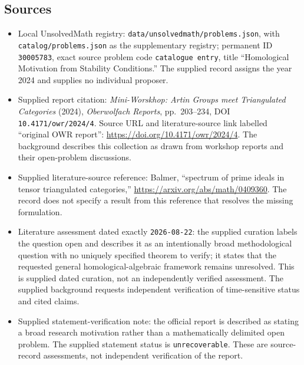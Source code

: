 \documentclass[11pt]{article}
\begin{document}
\subsection{Sources}
\begin{itemize}
\item Local UnsolvedMath registry: \texttt{data/unsolvedmath/problems.json}, with \texttt{catalog/problems.json} as the supplementary registry; permanent ID \texttt{30005783}, exact source problem code \texttt{catalogue entry}, title ``Homological Motivation from Stability Conditions.'' The supplied record assigns the year 2024 and supplies no individual proposer.
\item Supplied report citation: \emph{Mini-Worskhop: Artin Groups meet Triangulated Categories} (2024), \emph{Oberwolfach Reports}, pp.\ 203--234, DOI \texttt{10.4171/owr/2024/4}. Source URL and literature-source link labelled ``original OWR report'': \url{https://doi.org/10.4171/owr/2024/4}. The background describes this collection as drawn from workshop reports and their open-problem discussions.
\item Supplied literature-source reference: Balmer, ``spectrum of prime ideals in tensor triangulated categories,'' \url{https://arxiv.org/abs/math/0409360}. The record does not specify a result from this reference that resolves the missing formulation.
\item Literature assessment dated exactly \texttt{2026-08-22}: the supplied curation labels the question open and describes it as an intentionally broad methodological question with no uniquely specified theorem to verify; it states that the requested general homological-algebraic framework remains unresolved. This is supplied dated curation, not an independently verified assessment. The supplied background requests independent verification of time-sensitive status and cited claims.
\item Supplied statement-verification note: the official report is described as stating a broad research motivation rather than a mathematically delimited open problem. The supplied statement status is \texttt{unrecoverable}. These are source-record assessments, not independent verification of the report.
\end{itemize}
\end{document}
